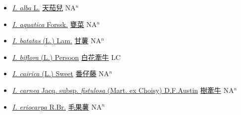 \begin{itemize}
  \begin{itemize}
        \item[] \href{http://www.theplantlist.org/tpl1.1/search?q=Ipomoea+alba}{\textit{I. alba} L.}   \href{\detokenize{http://taibnet.sinica.edu.tw/chi/taibnet_species_list.php?T2=天茄兒&T2_new_value=true&fr=y}}{天茄兒} NA$^n$
        \item[] \href{http://www.theplantlist.org/tpl1.1/search?q=Ipomoea+aquatica}{\textit{I. aquatica} Forssk.}   \href{\detokenize{http://taibnet.sinica.edu.tw/chi/taibnet_species_list.php?T2=甕菜&T2_new_value=true&fr=y}}{甕菜} NA$^n$
        \item[] \href{http://www.theplantlist.org/tpl1.1/search?q=Ipomoea+batatas}{\textit{I. batatas} (L.) Lam.}   \href{\detokenize{http://taibnet.sinica.edu.tw/chi/taibnet_species_list.php?T2=甘薯&T2_new_value=true&fr=y}}{甘薯} NA$^n$
        \item[] \href{http://www.theplantlist.org/tpl1.1/search?q=Ipomoea+biflora}{\textit{I. biflora} (L.) Persoon}   \href{\detokenize{http://taibnet.sinica.edu.tw/chi/taibnet_species_list.php?T2=白花牽牛&T2_new_value=true&fr=y}}{白花牽牛} LC
        \item[] \href{http://www.theplantlist.org/tpl1.1/search?q=Ipomoea+cairica}{\textit{I. cairica} (L.) Sweet}   \href{\detokenize{http://taibnet.sinica.edu.tw/chi/taibnet_species_list.php?T2=番仔藤&T2_new_value=true&fr=y}}{番仔藤} NA$^n$
        \item[] \href{http://www.theplantlist.org/tpl1.1/search?q=Ipomoea+carnea+subsp.+fistulosa}{\textit{I. carnea} Jacq. subsp. \textit{fistulosa} (Mart. ex Choisy) D.F.Austin}   \href{\detokenize{http://taibnet.sinica.edu.tw/chi/taibnet_species_list.php?T2=樹牽牛&T2_new_value=true&fr=y}}{樹牽牛} NA$^n$
        \item[] \href{http://www.theplantlist.org/tpl1.1/search?q=Ipomoea+eriocarpa}{\textit{I. eriocarpa} R.Br.}   \href{\detokenize{http://taibnet.sinica.edu.tw/chi/taibnet_species_list.php?T2=毛果薯&T2_new_value=true&fr=y}}{毛果薯} NA$^n$

\end{itemize}
\end{itemize}
